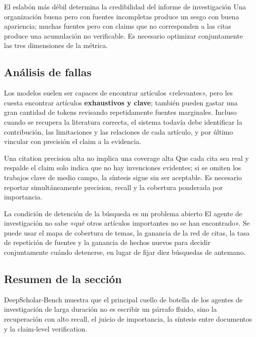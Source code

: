 
\begin{importantbox}{El eslabón más débil determina la credibilidad del informe de investigación}
Una organización buena pero con fuentes incompletas produce un sesgo con buena apariencia; muchas fuentes pero con claims que no corresponden a las citas produce una acumulación no verificable. Es necesario optimizar conjuntamente las tres dimensiones de la métrica.
\end{importantbox}

\subsection{Análisis de fallas}


Los modelos suelen ser capaces de encontrar artículos «relevantes», pero les cuesta encontrar artículos \textbf{exhaustivos y clave}; también pueden gastar una gran cantidad de tokens revisando repetidamente fuentes marginales. Incluso cuando se recupera la literatura correcta, el sistema todavía debe identificar la contribución, las limitaciones y las relaciones de cada artículo, y por último vincular con precisión el claim a la evidencia.

\begin{warningbox}{Una citation precision alta no implica una coverage alta}
Que cada cita sea real y respalde el claim solo indica que no hay invenciones evidentes; si se omiten los trabajos clave de medio campo, la síntesis sigue sin ser aceptable. Es necesario reportar simultáneamente precision, recall y la cobertura ponderada por importancia.
\end{warningbox}

\begin{knowledgebox}{La condición de detención de la búsqueda es un problema abierto}
El agente de investigación no sabe «qué otros artículos importantes no se han encontrado». Se puede usar el mapa de cobertura de temas, la ganancia de la red de citas, la tasa de repetición de fuentes y la ganancia de hechos nuevos para decidir conjuntamente cuándo detenerse, en lugar de fijar diez búsquedas de antemano.
\end{knowledgebox}

\subsection{Resumen de la sección}

DeepScholar-Bench muestra que el principal cuello de botella de los agentes de investigación de larga duración no es escribir un párrafo fluido, sino la recuperación con alto recall, el juicio de importancia, la síntesis entre documentos y la claim-level verification.
